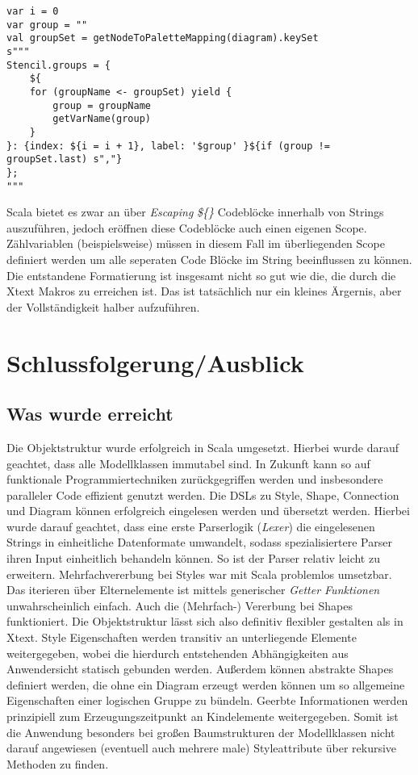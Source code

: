 \begin{lstlisting}[style = scala, caption = {String der in Scala über Interpolation modifiziert wird}, label = {lst:scalastring}]
var i = 0
var group = ""
val groupSet = getNodeToPaletteMapping(diagram).keySet
s"""
Stencil.groups = {
	${
	for (groupName <- groupSet) yield {
		group = groupName
		getVarName(group)
	}
}: {index: ${i = i + 1}, label: '$group' }${if (group != groupSet.last) s","}
};
"""
\end{lstlisting}Scala bietet es zwar an über \textit{Escaping} \textit{\$\{\}} Codeblöcke innerhalb von Strings auszuführen, jedoch eröffnen diese Codeblöcke auch einen eigenen Scope. Zählvariablen (beispielsweise) müssen in diesem Fall im überliegenden Scope definiert werden um alle seperaten Code Blöcke im String beeinflussen zu können. Die entstandene Formatierung ist insgesamt nicht so gut wie die, die durch die Xtext Makros zu erreichen ist. Das ist tatsächlich nur ein kleines Ärgernis, aber der Vollständigkeit halber aufzuführen.

\section{Schlussfolgerung/Ausblick}
\subsection{Was wurde erreicht}
Die Objektstruktur wurde erfolgreich in Scala umgesetzt. Hierbei wurde darauf geachtet, dass alle Modellklassen immutabel sind. In Zukunft kann so auf funktionale Programmiertechniken zurückgegriffen werden und insbesondere paralleler Code effizient genutzt werden. Die DSLs zu Style, Shape, Connection und Diagram können erfolgreich eingelesen werden und übersetzt werden. Hierbei wurde darauf geachtet, dass eine erste Parserlogik (\textit{Lexer}) die eingelesenen Strings in einheitliche Datenformate umwandelt, sodass spezialisiertere Parser ihren Input einheitlich behandeln können. So ist der Parser relativ leicht zu erweitern. Mehrfachvererbung bei Styles war mit Scala problemlos umsetzbar. Das iterieren über Elternelemente ist mittels generischer \textit{Getter Funktionen} unwahrscheinlich einfach. Auch die (Mehrfach-) Vererbung bei Shapes funktioniert. Die Objektstruktur lässt sich also definitiv flexibler gestalten als in Xtext. Style Eigenschaften werden transitiv an unterliegende Elemente weitergegeben, wobei die hierdurch entstehenden Abhängigkeiten aus Anwendersicht statisch gebunden werden. Außerdem können abstrakte Shapes definiert werden, die ohne ein Diagram erzeugt werden können um so allgemeine Eigenschaften einer logischen Gruppe zu bündeln. Geerbte Informationen werden prinzipiell zum Erzeugungszeitpunkt an Kindelemente weitergegeben. Somit ist die Anwendung besonders bei großen Baumstrukturen der Modellklassen nicht darauf angewiesen (eventuell auch mehrere male) Styleattribute über rekursive Methoden zu finden. 
